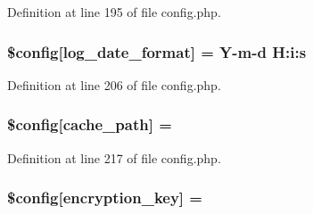 Definition at line 195 of file config.\+php.

\subsubsection[{\texorpdfstring{\$config}{$config}}]{\setlength{\rightskip}{0pt plus 5cm}\$config\mbox{[}\textquotesingle{}log\+\_\+date\+\_\+format\textquotesingle{}\mbox{]} = \textquotesingle{}Y-\/{\bf m}-\/{\bf d} H\+:i\+:s\textquotesingle{}}\hypertarget{ci_2application_2config_2config_8php_a9cc05811c32c13c55ed407435a3a31b6}{}\label{ci_2application_2config_2config_8php_a9cc05811c32c13c55ed407435a3a31b6}


Definition at line 206 of file config.\+php.

\subsubsection[{\texorpdfstring{\$config}{$config}}]{\setlength{\rightskip}{0pt plus 5cm}\$config\mbox{[}\textquotesingle{}cache\+\_\+path\textquotesingle{}\mbox{]} = \textquotesingle{}\textquotesingle{}}\hypertarget{ci_2application_2config_2config_8php_ae3a5dd52b4d040adb6461b9a17d1e0f0}{}\label{ci_2application_2config_2config_8php_ae3a5dd52b4d040adb6461b9a17d1e0f0}


Definition at line 217 of file config.\+php.

\subsubsection[{\texorpdfstring{\$config}{$config}}]{\setlength{\rightskip}{0pt plus 5cm}\$config\mbox{[}\textquotesingle{}encryption\+\_\+key\textquotesingle{}\mbox{]} = \textquotesingle{}\textquotesingle{}}\hypertarget{ci_2application_2config_2config_8php_aefa5c9d6e7a454a6218df87e65796357}{}\label{ci_2application_2config_2config_8php_aefa5c9d6e7a454a6218df87e65796357}


